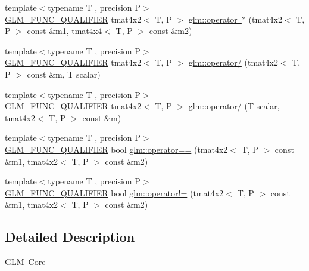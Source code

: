 \begin{DoxyCompactItemize}
\item 
{\footnotesize template$<$typename T , precision P$>$ }\\\mbox{\hyperlink{setup_8hpp_a33fdea6f91c5f834105f7415e2a64407}{G\+L\+M\+\_\+\+F\+U\+N\+C\+\_\+\+Q\+U\+A\+L\+I\+F\+I\+ER}} tmat4x2$<$ T, P $>$ \mbox{\hyperlink{namespaceglm_a5816bff7bb69e5ac20ce495ce1f46ef8}{glm\+::operator $\ast$}} (tmat4x2$<$ T, P $>$ const \&m1, tmat4x4$<$ T, P $>$ const \&m2)
\item 
{\footnotesize template$<$typename T , precision P$>$ }\\\mbox{\hyperlink{setup_8hpp_a33fdea6f91c5f834105f7415e2a64407}{G\+L\+M\+\_\+\+F\+U\+N\+C\+\_\+\+Q\+U\+A\+L\+I\+F\+I\+ER}} tmat4x2$<$ T, P $>$ \mbox{\hyperlink{namespaceglm_a0b113142b6dc2d32a34cbe0fe27da3d0}{glm\+::operator/}} (tmat4x2$<$ T, P $>$ const \&m, T scalar)
\item 
{\footnotesize template$<$typename T , precision P$>$ }\\\mbox{\hyperlink{setup_8hpp_a33fdea6f91c5f834105f7415e2a64407}{G\+L\+M\+\_\+\+F\+U\+N\+C\+\_\+\+Q\+U\+A\+L\+I\+F\+I\+ER}} tmat4x2$<$ T, P $>$ \mbox{\hyperlink{namespaceglm_a5354c891de3062e954e26233220d0875}{glm\+::operator/}} (T scalar, tmat4x2$<$ T, P $>$ const \&m)
\item 
{\footnotesize template$<$typename T , precision P$>$ }\\\mbox{\hyperlink{setup_8hpp_a33fdea6f91c5f834105f7415e2a64407}{G\+L\+M\+\_\+\+F\+U\+N\+C\+\_\+\+Q\+U\+A\+L\+I\+F\+I\+ER}} bool \mbox{\hyperlink{namespaceglm_ada1f939e41cfb8698776f1e46e937888}{glm\+::operator==}} (tmat4x2$<$ T, P $>$ const \&m1, tmat4x2$<$ T, P $>$ const \&m2)
\item 
{\footnotesize template$<$typename T , precision P$>$ }\\\mbox{\hyperlink{setup_8hpp_a33fdea6f91c5f834105f7415e2a64407}{G\+L\+M\+\_\+\+F\+U\+N\+C\+\_\+\+Q\+U\+A\+L\+I\+F\+I\+ER}} bool \mbox{\hyperlink{namespaceglm_a5aa2e8081235bbd78c8d858494c582b8}{glm\+::operator!=}} (tmat4x2$<$ T, P $>$ const \&m1, tmat4x2$<$ T, P $>$ const \&m2)
\end{DoxyCompactItemize}


\subsection{Detailed Description}
\mbox{\hyperlink{group__core}{G\+LM Core}} 